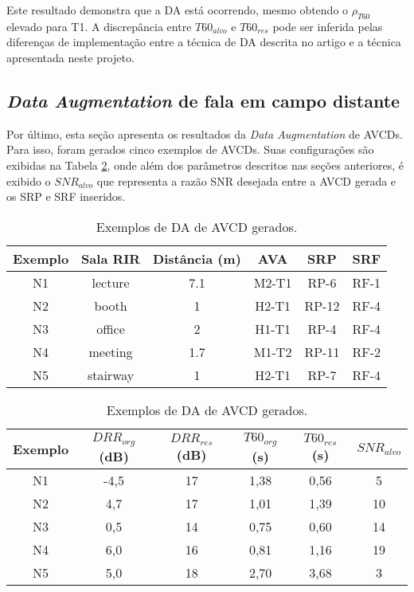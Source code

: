 Este resultado demonstra que a DA está ocorrendo, mesmo obtendo o $\rho_{T60}$ elevado para T1.
A discrepância entre $T60_{alvo}$ e $T60_{res}$ pode ser inferida pelas diferenças de implementação entre a técnica de DA descrita no artigo 
\cite{RIR_Data_Aug} e a técnica apresentada neste projeto. 


\subsection{\textit{Data Augmentation} de fala em campo distante}

Por último, esta seção apresenta os resultados da \textit{Data Augmentation} de AVCDs. Para isso, 
foram gerados cinco exemplos de AVCDs. Suas configurações são exibidas na Tabela \ref{tbl:da-noise}, onde além dos parâmetros descritos nas
seções anteriores, é exibido o $SNR_{alvo}$ que representa a razão SNR desejada entre a AVCD gerada e os SRP e SRF inseridos.

\begin{table} [H]
    \centering
    \caption{Exemplos de DA de AVCD gerados.}
    \label{tbl:da-noise}
    \begin{tabular}{c|c|c|c|c|c}

        \textbf{Exemplo} & 
        \textbf{Sala RIR} & 
        \textbf{Distância (m)} &
        \textbf{AVA} &
        \textbf{SRP} &
        \textbf{SRF} \\
        \hline 

        N1 & lecture & 7.1 & M2-T1 & RP-6 & RF-1 \\
        N2 & booth & 1 & H2-T1 & RP-12 & RF-4 \\
        N3 & office & 2 & H1-T1 & RP-4 & RF-4 \\
        N4 & meeting & 1.7 & M1-T2 & RP-11 & RF-2 \\
        N5 & stairway & 1 & H2-T1 & RP-7 & RF-4 \\

    \end{tabular}
    \bigbreak
    \bigbreak
    \begin{tabular}{c|c|c|c|c|c}

        \textbf{Exemplo} & 
        \textbf{$DRR_{org}$ (dB)} & 
        \textbf{$DRR_{res}$ (dB)} & 
        \textbf{$T60_{org}$ (s)} & 
        \textbf{$T60_{res}$ (s)} &
        \textbf{$SNR_{alvo}$} \\
        \hline 

        N1 & -4,5 & 17 & 1,38 & 0,56 & 5 \\
        N2 & 4,7 & 17 & 1,01 & 1,39 & 10 \\
        N3 & 0,5 & 14 & 0,75 & 0,60 & 14 \\
        N4 & 6,0 & 16 & 0,81 & 1,16 & 19 \\
        N5 & 5,0 & 18 & 2,70 & 3,68 & 3 \\

    \end{tabular}
\end{table}

